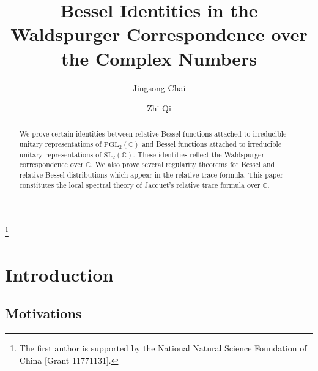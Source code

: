 \documentclass{amsproc}
\theoremstyle{plain}
\numberwithin{equation}{section}
\begin{document}
	
	
	\title{Bessel Identities in the Waldspurger Correspondence over the Complex Numbers}
	
	
	
	\author{Jingsong Chai}
	\address{School of Mathematics\\ Sun Yat-sen University \\Guangzhou,  510275\\China}
	
	
	\author{Zhi Qi}
	\address{School of Mathematical Sciences\\ Zhejiang University\\Hangzhou 310027\\China}
	
	
	
	
	\keywords{}
	\thanks{The first author is supported by the National Natural Science
Foundation of China [Grant 11771131].}
	
	
	\begin{abstract}
		We prove certain identities between relative Bessel functions attached to irreducible unitary representations of $\mathrm{PGL}_2(\mathbb{C})$ and Bessel functions attached to irreducible unitary representations of $\mathrm{SL}_2 (\mathbb{C})$. These identities reflect the Waldspurger correspondence over $\mathbb{C}$. We also prove several regularity theorems for Bessel and relative Bessel distributions which appear in the relative trace formula. This paper constitutes the local   spectral theory of Jacquet's relative trace formula over $\mathbb{C}$.
	\end{abstract}
	
	\maketitle
	
	\section{Introduction}
	
	\subsection{Motivations}
	
\end{document}
